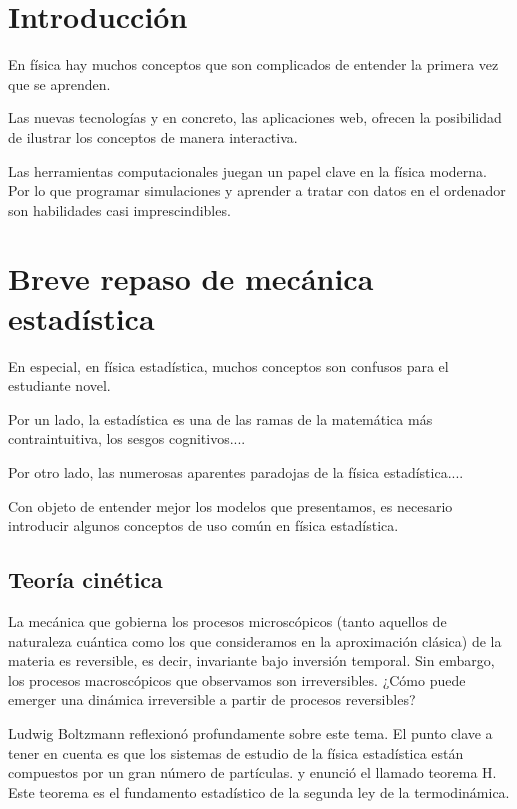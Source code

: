 \documentclass[11pt, a4paper]{article} %
\theoremstyle{named}
\begin{document}
\tableofcontents

\newpage
\section{Introducción}
\label{sec:intro}

En física hay muchos conceptos que son complicados de entender la primera vez que se aprenden.

Las nuevas tecnologías y en concreto, las aplicaciones web, ofrecen la posibilidad de ilustrar los conceptos de manera interactiva.

Las herramientas computacionales juegan un papel clave en la física moderna. Por lo que programar simulaciones y aprender a tratar con datos en el ordenador son habilidades casi imprescindibles.

\section{Breve repaso de mecánica estadística}\label{sec:fises}

En especial, en física estadística, muchos conceptos son confusos para el estudiante novel.

Por un lado, la estadística es una de las ramas de la matemática más contraintuitiva, los sesgos cognitivos....

Por otro lado, las numerosas aparentes paradojas de la física estadística....

Con objeto de entender mejor los modelos que presentamos, es necesario introducir algunos conceptos de uso común en física estadística.


\subsection{Teoría cinética}

La mecánica que gobierna los procesos microscópicos (tanto aquellos de naturaleza cuántica como los que consideramos en la aproximación clásica) de la materia es reversible, es decir, invariante bajo inversión temporal. Sin embargo, los procesos macroscópicos que observamos son irreversibles. ¿Cómo puede emerger una dinámica irreversible a partir de procesos reversibles?

Ludwig Boltzmann reflexionó profundamente sobre este tema. El punto clave a tener en cuenta es que los sistemas de estudio de la física estadística están compuestos por un gran número de partículas. y enunció el llamado teorema H. Este teorema es el fundamento estadístico de la segunda ley de la termodinámica.
\end{document}
